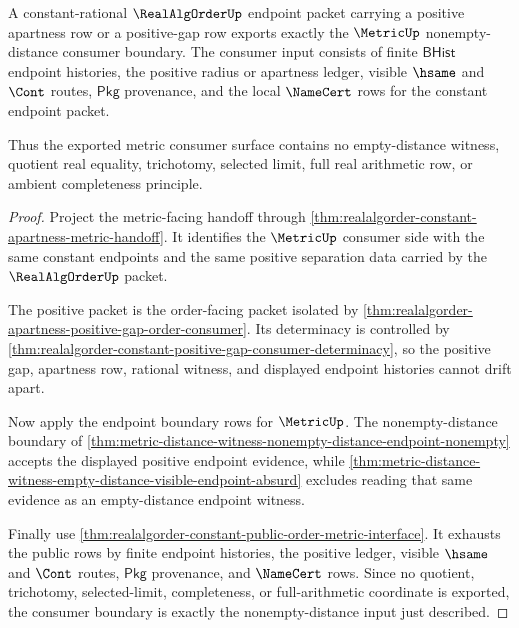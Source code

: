\begin{theorem}
\label{thm:realalgorder-constant-positive-boundary-metric-consumer}
A constant-rational $\RealAlgOrderUp$ endpoint packet carrying a positive
apartness row or a positive-gap row exports exactly the $\MetricUp$
nonempty-distance consumer boundary. The consumer input consists of finite
$\mathsf{BHist}$ endpoint histories, the positive radius or apartness ledger,
visible $\hsame$ and $\Cont$ routes, $\mathsf{Pkg}$ provenance, and the local
$\NameCert$ rows for the constant endpoint packet.

Thus the exported metric consumer surface contains no empty-distance witness,
quotient real equality, trichotomy, selected limit, full real arithmetic row, or
ambient completeness principle.
\end{theorem}
\begin{proof}
Project the metric-facing handoff through
\autoref{thm:realalgorder-constant-apartness-metric-handoff}. It identifies
the $\MetricUp$ consumer side with the same constant endpoints and the same
positive separation data carried by the $\RealAlgOrderUp$ packet.

The positive packet is the order-facing packet isolated by
\autoref{thm:realalgorder-apartness-positive-gap-order-consumer}. Its
determinacy is controlled by
\autoref{thm:realalgorder-constant-positive-gap-consumer-determinacy}, so the
positive gap, apartness row, rational witness, and displayed endpoint histories
cannot drift apart.

Now apply the endpoint boundary rows for $\MetricUp$. The nonempty-distance
boundary of
\autoref{thm:metric-distance-witness-nonempty-distance-endpoint-nonempty}
accepts the displayed positive endpoint evidence, while
\autoref{thm:metric-distance-witness-empty-distance-visible-endpoint-absurd}
excludes reading that same evidence as an empty-distance endpoint witness.

Finally use
\autoref{thm:realalgorder-constant-public-order-metric-interface}. It exhausts
the public rows by finite endpoint histories, the positive ledger, visible
$\hsame$ and $\Cont$ routes, $\mathsf{Pkg}$ provenance, and $\NameCert$ rows.
Since no quotient, trichotomy, selected-limit, completeness, or full-arithmetic
coordinate is exported, the consumer boundary is exactly the nonempty-distance
input just described.
\end{proof}

